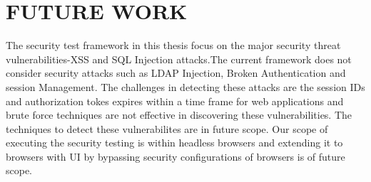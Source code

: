 \chapter{FUTURE WORK}
The security test framework in this thesis focus on the major security threat vulnerabilities-XSS and SQL Injection attacks.The current framework does not consider security attacks such as LDAP Injection, Broken Authentication and session Management. The challenges in detecting these attacks are the session IDs and authorization tokes expires within a time frame for web applications and brute force techniques are not effective in discovering these vulnerabilities. The techniques to detect these vulnerabilites are in future scope. Our scope of executing the security testing is within headless browsers and extending it to browsers with UI by bypassing security configurations of browsers is of future scope.
